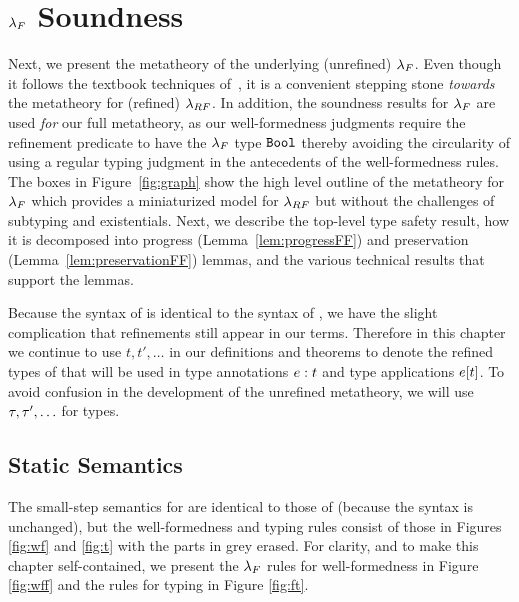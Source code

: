 \chapter{$\lambda_{F}$ Soundness}
\label{ch:systemF}

Next, we present the metatheory  
of the underlying (unrefined) 
$\lambda_{F}$. Even though it follows the textbook techniques of~\citet{TAPL},
it is a convenient 
stepping stone \emph{towards} 
the metatheory for (refined) $\lambda_{RF}$.
%
In addition, the soundness results 
for $\lambda_{F}$ are used \emph{for}                       %
our full metatheory, as our well-formedness           %
judgments require the refinement                      %
predicate to have the $\lambda_{F}$ type 
$\texttt{Bool}$ thereby avoiding the circularity 
of using a regular typing judgment in the 
antecedents of the well-formedness rules. 
%
%
The \colboth boxes in Figure~\ref{fig:graph}
show the high level outline of the metatheory 
for $\lambda_{F}$ which provides a miniaturized model
for $\lambda_{RF}$ but without the challenges 
of subtyping
and existentials. Next, we describe the top-level 
type safety result, how it is decomposed into 
progress (Lemma~\ref{lem:progressFF}) and 
preservation (Lemma~\ref{lem:preservationFF}) 
lemmas, and the various technical results that 
support the lemmas.

Because the syntax of \sysf is identical to the
syntax of \sysrf, we have the slight complication
that refinements still appear in our terms.
%
Therefore in this chapter we continue to use $t, t', \ldots$ 
in our definitions and theorems to denote the 
refined types of \sysrf that will be used
in type annotations $e : t$
and type applications $e[t]$. 
%
To avoid confusion in the development of the
unrefined metatheory, we will
use $\tau, \tau',\ldots$ for 
\sysf types. 

\section{Static Semantics}
\label{sec:staticF}

The small-step semantics for \sysf are identical to
those of \sysrf (because the syntax is unchanged),
but the well-formedness and typing rules consist 
of those in Figures \ref{fig:wf} and \ref{fig:t}
with the parts in grey erased.
%
For clarity, 
and to make this chapter self-contained,
we present the $\lambda_{F}$ rules for
well-formedness in Figure \ref{fig:wff} and the 
rules for typing in Figure \ref{fig:ft}.

